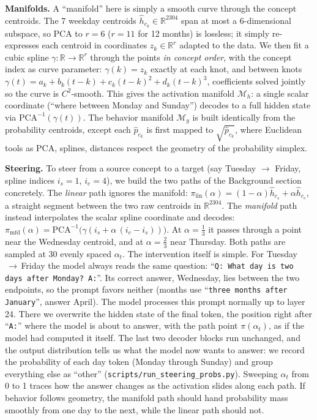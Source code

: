 \documentclass[10pt]{article}
\begin{document}
\textbf{Manifolds.} A ``manifold'' here is simply a smooth curve through the
concept centroids. The 7 weekday centroids $\hat h_{c_k}\in\mathbb{R}^{2304}$
span at most a 6-dimensional subspace, so PCA to $r{=}6$ ($r{=}11$ for 12
months) is lossless; it simply re-expresses each centroid in coordinates
$z_k\in\mathbb{R}^r$ adapted to the data. We then fit a cubic spline
$\gamma:\mathbb{R}\to\mathbb{R}^r$ through the points \emph{in concept
order}, with the concept index as curve parameter: $\gamma(k)=z_k$ exactly at
each knot, and between knots
$\gamma(t)=a_k+b_k(t{-}k)+c_k(t{-}k)^2+d_k(t{-}k)^3$, coefficients solved
jointly so the curve is $C^2$-smooth. This gives the activation manifold
$\mathcal{M}_h$: a single scalar coordinate (``where between Monday and
Sunday'') decodes to a full hidden state via
$\mathrm{PCA}^{-1}(\gamma(t))$. The behavior manifold $\mathcal{M}_y$ is
built identically from the probability centroids, except each $\hat p_{c_k}$
is first mapped to $\sqrt{\hat p_{c_k}}$, where Euclidean
tools as PCA, splines, distances respect the geometry of the probability
simplex.

\textbf{Steering.} To steer from a source concept to a target (say Tuesday
$\to$ Friday, spline indices $i_s{=}1$, $i_e{=}4$), we build the two paths of
the Background section concretely. The \emph{linear} path ignores the
manifold: $\pi_{\mathrm{lin}}(\alpha)=(1-\alpha)\hat h_{c_s}+\alpha\hat
h_{c_e}$, a straight segment between the two raw centroids in
$\mathbb{R}^{2304}$. The \emph{manifold} path instead interpolates the
scalar spline coordinate and decodes:
$\pi_{\mathrm{mfd}}(\alpha)=\mathrm{PCA}^{-1}\!\big(\gamma(i_s+\alpha\,(i_e{-}i_s))\big)$.
At $\alpha=\tfrac13$ it passes through a point near the Wednesday centroid,
and at $\alpha=\tfrac23$ near Thursday. Both paths are sampled at 30 evenly
spaced $\alpha_t$. The intervention itself is simple. For
Tuesday$\,\to\,$Friday the model always reads the same question:
``\texttt{Q: What day is two days after Monday? A:}''. Its correct answer,
Wednesday, lies between the two endpoints, so the prompt favors neither
(months use ``\texttt{three months after January}'', answer April). The model
processes this prompt normally up to layer 24. There we overwrite the hidden
state of the final token, the position right after ``\texttt{A:}'' where the
model is about to answer, with the path point $\pi(\alpha_t)$, as if the
model had computed it itself. The last two decoder blocks run unchanged, and
the output distribution tells us what the model now wants to answer: we
record the probability of each day token (Monday through Sunday) and group
everything else as ``other'' (\texttt{scripts/run\_steering\_probs.py}).
Sweeping $\alpha_t$ from 0 to 1 traces how the answer changes as the
activation slides along each path. If behavior follows geometry, the manifold
path should hand probability mass smoothly from one day to the next, while
the linear path should not.
\end{document}

